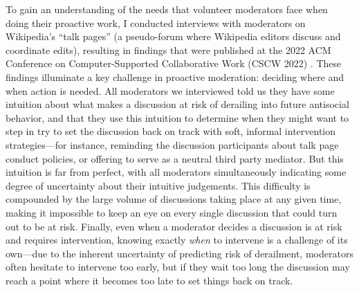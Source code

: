 \documentclass[11pt,letterpaper]{article}
\begin{document}

To gain an understanding of the needs that volunteer moderators face when doing their proactive work, I conducted interviews with moderators on Wikipedia's ``talk pages'' (a pseudo-forum where Wikipedia editors discuss and coordinate edits), resulting in findings that were published at the 2022 ACM Conference on Computer-Supported Collaborative Work (CSCW 2022) \cite{schluger_proactive_2022}.
These findings illuminate a key challenge in proactive moderation: deciding where and when action is needed.
All moderators we interviewed told us they have some intuition about what makes a discussion at risk of derailing into future antisocial behavior, and that they use this intuition to determine when they might want to step in try to set the discussion back on track with soft, informal intervention strategies---for instance, reminding the discussion participants about talk page conduct policies, or offering to serve as a neutral third party mediator.
But this intuition is far from perfect, with all moderators simultaneously indicating some degree of uncertainty about their intuitive judgements.
This difficulty is compounded by the large volume of discussions taking place at any given time, making it impossible to keep an eye on every single discussion that could turn out to be at risk.
Finally, even when a moderator decides a discussion is at risk and requires intervention, knowing exactly \emph{when} to intervene is a challenge of its own---due to the inherent uncertainty of predicting risk of derailment, moderators often hesitate to intervene too early, but if they wait too long the discussion may reach a point where it becomes too late to set things back on track.%
\end{document}
